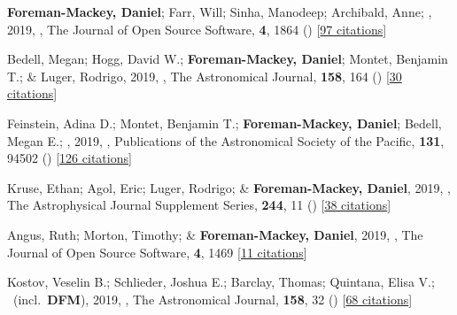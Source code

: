 \item[{\color{numcolor}\scriptsize49}] \textbf{Foreman-Mackey, Daniel}; Farr, Will; Sinha, Manodeep; Archibald, Anne; \etal, 2019, , The Journal of Open Source Software, \textbf{4}, 1864 () [\href{https://ui.adsabs.harvard.edu/abs/2019JOSS....4.1864F}{97 citations}]

\item[{\color{numcolor}\scriptsize48}] Bedell, Megan; Hogg, David W.; \textbf{Foreman-Mackey, Daniel}; Montet, Benjamin T.; \& Luger, Rodrigo, 2019, , The Astronomical Journal, \textbf{158}, 164 () [\href{https://ui.adsabs.harvard.edu/abs/2019AJ....158..164B}{30 citations}]

\item[{\color{numcolor}\scriptsize47}] Feinstein, Adina D.; Montet, Benjamin T.; \textbf{Foreman-Mackey, Daniel}; Bedell, Megan E.; \etal, 2019, , Publications of the Astronomical Society of the Pacific, \textbf{131}, 94502 () [\href{https://ui.adsabs.harvard.edu/abs/2019PASP..131i4502F}{126 citations}]

\item[{\color{numcolor}\scriptsize46}] Kruse, Ethan; Agol, Eric; Luger, Rodrigo; \& \textbf{Foreman-Mackey, Daniel}, 2019, , The Astrophysical Journal Supplement Series, \textbf{244}, 11 () [\href{https://ui.adsabs.harvard.edu/abs/2019ApJS..244...11K}{38 citations}]

\item[{\color{numcolor}\scriptsize45}] Angus, Ruth; Morton, Timothy; \& \textbf{Foreman-Mackey, Daniel}, 2019, , The Journal of Open Source Software, \textbf{4}, 1469 [\href{https://ui.adsabs.harvard.edu/abs/2019JOSS....4.1469A}{11 citations}]

\item[{\color{numcolor}\scriptsize44}] Kostov, Veselin B.; Schlieder, Joshua E.; Barclay, Thomas; Quintana, Elisa V.; \etal\ (incl.\ \textbf{DFM}), 2019, , The Astronomical Journal, \textbf{158}, 32 () [\href{https://ui.adsabs.harvard.edu/abs/2019AJ....158...32K}{68 citations}]

